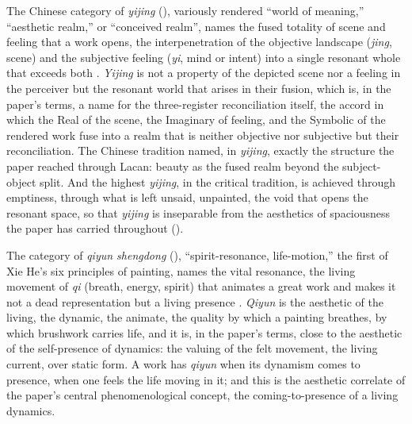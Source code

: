 The Chinese category of \emph{yijing} (), variously rendered ``world of meaning,'' ``aesthetic realm,'' or ``conceived realm'', names the fused totality of scene and feeling that a work opens, the interpenetration of the objective landscape (\emph{jing}, scene) and the subjective feeling (\emph{yi}, mind or intent) into a single resonant whole that exceeds both \parencite{yeh1987}. \emph{Yijing} is not a property of the depicted scene nor a feeling in the perceiver but the resonant world that arises in their fusion, which is, in the paper's terms, a name for the three-register reconciliation itself, the accord in which the Real of the scene, the Imaginary of feeling, and the Symbolic of the rendered work fuse into a realm that is neither objective nor subjective but their reconciliation. The Chinese tradition named, in \emph{yijing}, exactly the structure the paper reached through Lacan: beauty as the fused realm beyond the subject-object split. And the highest \emph{yijing}, in the critical tradition, is achieved through emptiness, through what is left unsaid, unpainted, the void that opens the resonant space, so that \emph{yijing} is inseparable from the aesthetics of spaciousness the paper has carried throughout ().

The category of \emph{qiyun shengdong} (), ``spirit-resonance, life-motion,'' the first of Xie He's six principles of painting, names the vital resonance, the living movement of \emph{qi} (breath, energy, spirit) that animates a great work and makes it not a dead representation but a living presence \parencite{cai2004}. \emph{Qiyun} is the aesthetic of the living, the dynamic, the animate, the quality by which a painting breathes, by which brushwork carries life, and it is, in the paper's terms, close to the aesthetic of the self-presence of dynamics: the valuing of the felt movement, the living current, over static form. A work has \emph{qiyun} when its dynamism comes to presence, when one feels the life moving in it; and this is the aesthetic correlate of the paper's central phenomenological concept, the coming-to-presence of a living dynamics.

